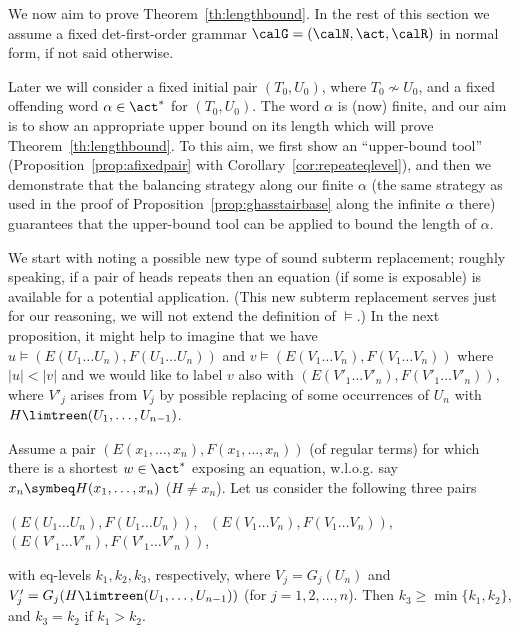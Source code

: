 \documentclass[12pt]{article}
\begin{document}
\noindent
We now aim to prove Theorem~\ref{th:lengthbound}.
In the rest of this section 
we assume a fixed
det-first-order grammar
$\calG=(\calN,\act,\calR)$ in normal form, if not said otherwise.

Later we will consider a fixed initial pair 
$(T_0,U_0)$, where $T_0\not\sim U_0$, and 
a fixed offending word 
$\alpha\in\act^*$ for $(T_0,U_0)$. 
The word $\alpha$ is (now) finite, and 
our aim is to show an appropriate upper bound on its length 
which will prove 
Theorem~\ref{th:lengthbound}.
To this aim, we first show an ``upper-bound tool'' 
(Proposition~\ref{prop:afixedpair} with
Corollary~\ref{cor:repeateqlevel}),
and then we 
demonstrate that the balancing strategy along our finite $\alpha$
(the same strategy as used
in the proof of 
Proposition~\ref{prop:ghasstairbase} along the infinite $\alpha$ there)
guarantees that the upper-bound tool can be applied to bound the
length of $\alpha$.

We start with noting a possible new type of
sound subterm replacement; roughly speaking, 
if a pair of heads repeats then an equation (if some is exposable)
is available 
for a potential application. (This new subterm replacement serves just
for our reasoning, we will not extend the definition of $\models$.) 
In the next proposition, 
it might help to imagine that we have 
$u\models  (E(U_1\dots U_n),F(U_1\dots U_n))$ and 
 $v\models (E(V_1\dots V_n),F(V_1\dots V_n))$ where $|u|<|v|$ and we
would like to label $v$ also with  
$(E(V'_1\dots V'_n),F(V'_1\dots V'_n))$, where $V'_j$ arises from
$V_j$ by possible replacing
of some occurrences of $U_n$ with 
$H\limtreen(U_1,\dots,U_{n-1})$.




\begin{prop}\label{prop:newreplacement}
Assume a pair $(E(x_1,\dots,x_n), F(x_1,\dots,x_n))$ (of regular
terms) for which there is a shortest
$w\in\act^*$ 
exposing an equation, w.l.o.g. say $x_n\symbeq H(x_1,\dots,x_n)$ 
($H\neq x_n$).
Let us consider the following three pairs 
\begin{center}
$(E(U_1\dots U_n),F(U_1\dots U_n))$,
\ $(E(V_1\dots V_n),F(V_1\dots V_n))$,
\ $(E(V'_1\dots V'_n),F(V'_1\dots V'_n))$,
\end{center}
with eq-levels $k_1,k_2,k_3$, respectively, where
$V_j=G_j(U_n)$ and $V'_j=G_j(H\limtreen(U_1,\dots,U_{n-1}))$
(for $j=1,2,\dots,n$).
Then $k_3\geq \min\{k_1,k_2\}$, and $k_3=k_2$ if $k_1>k_2$.
\end{prop}
\end{document}
